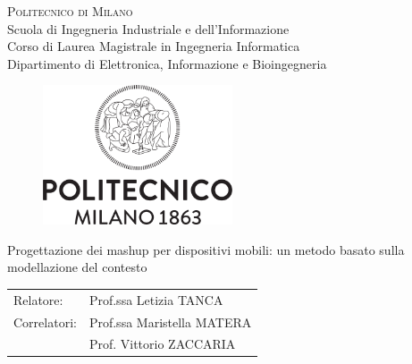 \begin{titlepage}

\begin{center}
\Large{\textsc{Politecnico di Milano}}\\
\Large{Scuola di Ingegneria Industriale e dell'Informazione}\\
\large{Corso di Laurea Magistrale in Ingegneria Informatica}\\
\large{Dipartimento di Elettronica, Informazione e Bioingegneria}
\par\end{center}

\vspace{0.5cm}


\begin{center}
\begin{figure}[h]
\centering{}\includegraphics[width=0.5\textwidth]{frontespizio/logo-polimi.png}
\end{figure}
\vspace{1cm}

\par\end{center}

\begin{center}
\LARGE{Progettazione dei mashup per dispositivi mobili: un metodo basato sulla modellazione del contesto}\vspace{2cm}

\par\end{center}

\begin{flushleft}
\begin{tabular}{ll}
Relatore:  & Prof.ssa Letizia TANCA\tabularnewline
Correlatori:  & Prof.ssa Maristella MATERA\tabularnewline
	& Prof. Vittorio ZACCARIA
\end{tabular}\vspace{1cm}

\par\end{flushleft}


\end{titlepage}
